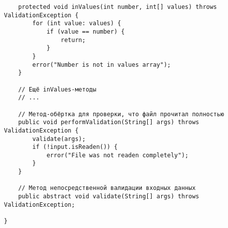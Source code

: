 \begin{verbatim}
    protected void inValues(int number, int[] values) throws ValidationException {
        for (int value: values) {
            if (value == number) {
                return;
            }
        }
        error("Number is not in values array");
    }
    
    // Ещё inValues-методы
    // ...
    
    // Метод-обёртка для проверки, что файл прочитал полностью
    public void performValidation(String[] args) throws ValidationException {
        validate(args);
        if (!input.isReaden()) {
            error("File was not readen completely");
        }
    }
    
    // Метод непосредственной валидации входных данных
    public abstract void validate(String[] args) throws ValidationException;
    
}
\end{verbatim}

